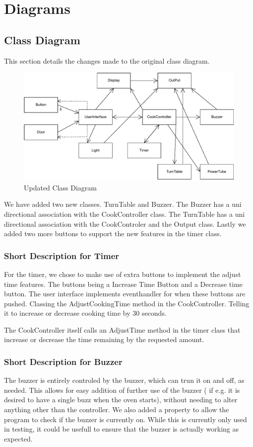 \section{Diagrams}

\subsection{Class Diagram}
This section details the changes made to the original class diagram.
\begin{figure}[h]
  \centering
  \includegraphics[scale=0.66]{02-Body/Image/ClassDiagram}
  \caption{Updated Class Diagram}%
  \label{fig:ClassDiagram}
\end{figure}
We have added two new classes. TurnTable and Buzzer.
The Buzzer has a uni directional association with the CookController class.
The TurnTable has a uni directional association with the CookControler and the Output class.
Lastly we added two more buttons to support the new features in the timer class.

\subsubsection{Short Description for Timer}
For the timer, we chose to make use of extra buttons to implement the adjust time features.
The buttons being a Increase Time Button and a Decrease time button. The user interface 
implements eventhandler for when these buttons are pushed. Classing the AdjustCookingTime
method in the CookController. Telling it to increase or decrease cooking time by 30 seconds.

The CookController itself calls an AdjustTime method in the timer class that increase or decrease
the time remaining by the requested amount.

\subsubsection{Short Description for Buzzer}
The buzzer is entirely controled by the buzzer, which can trun it on and off, as needed. This allows for easy addition of further use of the buzzer ( if e.g. it is desired to have a single buzz when the oven starts), without needing to alter anything other than the controller. We also added a property to allow the program to check if the buzzer is currently on. While this is currently only used in testing, it could be usefull to ensure that the buzzer is actually working as expected.

